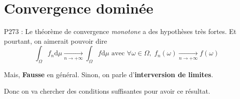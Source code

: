 
\newpage
\section{Convergence dominée} %
\label{sec:Convergence dominée}

P273 : Le théorème de convergence \textit{monotone} a des hypothèses très fortes. Et pourtant, on aimerait pouvoir dire 
\begin{equation}
  \int_{\Omega}^{} f_n \mathrm{d}\mu  \underset{n \to +\infty}{\longrightarrow} \int_{\Omega}^{} f \mathrm{d}\mu \text{ avec } \forall \omega \in \Omega, \; f_n(\omega)  \underset{n \to +\infty}{\longrightarrow} f(\omega)
\end{equation}

Mais, \textbf{Fausse} en général. Sinon, on parle d'\textbf{interversion de limites}.






Donc on va chercher des conditions suffisantes pour avoir ce résultat.

